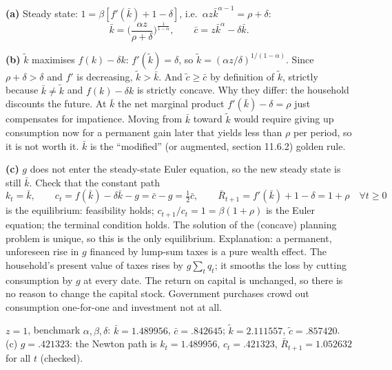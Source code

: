 \documentclass[12pt, letterpaper]{article}
\newcommand{\Rb}{\bar R}
\newcommand{\kb}{\bar k}
\newcommand{\cb}{\bar c}
\begin{document}
\begin{tcolorbox}[oddbox,title={Exercise 11.5 \quad Log utility, the golden rule and a jump in $g$}]
\textbf{(a)} Steady state: $1=\beta[f'(\kb)+1-\delta]$, i.e.\ $\alpha z\kb^{\alpha-1}=\rho+\delta$:
\[
\kb=\Big(\frac{\alpha z}{\rho+\delta}\Big)^{\frac1{1-\alpha}},\qquad \cb=z\kb^\alpha-\delta\kb .
\]

\textbf{(b)} $\tilde k$ maximises $f(k)-\delta k$: $f'(\tilde k)=\delta$, so $\tilde k=(\alpha z/\delta)^{1/(1-\alpha)}$.
Since $\rho+\delta>\delta$ and $f'$ is decreasing, $\tilde k>\kb$. And $\tilde c\ge\cb$ by definition of $\tilde k$,
strictly because $\kb\ne\tilde k$ and $f(k)-\delta k$ is strictly concave. Why they differ: the household discounts the
future. At $\kb$ the net marginal product $f'(\kb)-\delta=\rho$ just compensates for impatience. Moving from $\kb$ toward
$\tilde k$ would require giving up consumption now for a permanent gain later that yields less than $\rho$ per period, so
it is not worth it. $\kb$ is the ``modified'' (or augmented, section 11.6.2) golden rule.

\textbf{(c)} $g$ does not enter the steady-state Euler equation, so the new steady state is still $\kb$. Check that the
constant path
\[
k_t=\kb,\qquad c_t=f(\kb)-\delta\kb-g=\cb-g=\tfrac12\cb,\qquad \Rb_{t+1}=f'(\kb)+1-\delta=1+\rho\quad\forall t\ge0
\]
is the equilibrium: feasibility holds; $c_{t+1}/c_t=1=\beta(1+\rho)$ is the Euler equation; the terminal condition holds.
The solution of the (concave) planning problem is unique, so this is the only equilibrium. Explanation: a permanent,
unforeseen rise in $g$ financed by lump-sum taxes is a pure wealth effect. The household's present value of taxes rises by
$g\sum_tq_t$; it smooths the loss by cutting consumption by $g$ at every date. The return on capital is unchanged, so there
is no reason to change the capital stock. Government purchases crowd out consumption one-for-one and investment not at all.

\begin{tcolorbox}[databox]
$z=1$, benchmark $\alpha,\beta,\delta$: $\kb=1.489956$, $\cb=.842645$; $\tilde k=2.111557$, $\tilde c=.857420$.
(c) $g=.421323$: the Newton path is $k_t=1.489956$, $c_t=.421323$, $\Rb_{t+1}=1.052632$ for all $t$ (checked).
\end{tcolorbox}
\end{tcolorbox}
\end{document}
